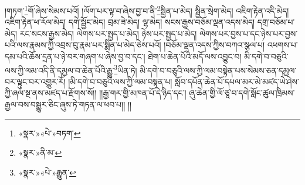 །གཏག་\footnote{«སྣར་»«པེ་»བཏག་}གོ་ཞེས་སེམས་པའོ། །ལོག་པར་ལྟ་བ་ཞེས་བྱ་བ་ནི་\footnote{«སྣར་»ནི་མ་}སྦྱིན་པ་མེད། སྦྱིན་སྲེག་མེད། འཇིག་རྟེན་འདི་མེད། འཇིག་རྟེན་ཕ་རོལ་མེད། དགེ་སྦྱོང་མེད། བྲམ་ཟེ་མེད། ལྷ་མེད། སངས་རྒྱས་བཅོམ་ལྡན་འདས་མེད། དགྲ་བཅོམ་པ་མེད། རང་སངས་རྒྱས་མེད། ལེགས་པར་སྤྱད་པ་མེད། ཉེས་པར་སྤྱད་པ་མེད། ལེགས་པར་བྱས་པ་དང་ཉེས་པར་བྱས་པའི་ལས་རྣམས་ཀྱི་འབྲས་བུ་རྣམ་པར་སྨིན་པ་མེད་ཅེས་པའོ། །བཅོམ་ལྡན་འདས་ཀྱིས་བཀའ་སྩལ་པ། འཕགས་པ་དམ་པའི་ཆོས་དྲན་པ་ཉེ་བར་གཞག་པ་ཞེས་བྱ་བ་དང་། ཐེག་པ་ཆེན་པོའི་མདོ་ལས་འབྱུང་བ། མི་དགེ་བ་བཅུའི་ལས་ཀྱི་ལམ་འདི་ནི་དམྱལ་བ་ཆེན་པོའི་རྒྱུ་\footnote{«སྣར་»«པེ་»རྒྱུན་}ཡིན་ཏེ། མི་དགེ་བ་བཅུའི་ལས་ཀྱི་ལམ་བསྟེན་པས་སེམས་ཅན་དམྱལ་བར་ལྟུང་བར་འགྱུར་རོ། །མི་དགེ་བ་བཅུའི་ལས་ཀྱི་ལམ་བསྟན་པ། སློབ་དཔོན་ཆེན་པོ་དཔལ་མར་མེ་མཛད་ཡེ་ཤེས་ཀྱི་ཞལ་སྔ་ནས་མཛད་པ་རྫོགས་སོ།། །།རྒྱ་གར་གྱི་མཁན་པོ་དེ་ཉིད་དང་། ཞུ་ཆེན་གྱི་ལོ་ཙཱ་བ་དགེ་སློང་ཚུལ་ཁྲིམས་རྒྱལ་བས་བསྒྱུར་ཅིང་ཞུས་ཏེ་གཏན་ལ་ཕབ་པ།། །།